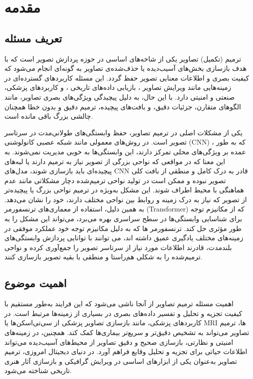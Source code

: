 \chapter{مقدمه}
\section{تعریف مسئله}

ترمیم (تکمیل) تصاویر 
یکی از شاخه‌های اساسی در حوزه پردازش تصویر است که با هدف بازسازی بخش‌های آسیب‌دیده یا حذف‌شده‌ی تصاویر به گونه‌ای انجام می‌شود که کیفیت بصری و اطلاعات معنایی تصویر حفظ گردد. این مسئله کاربردهای گسترده‌ای در زمینه‌هایی مانند ویرایش تصاویر 
\cite{joSCFEGANFaceEditing2019}
، بازیابی داده‌های تاریخی %
\cite{wanBringingOldPhotos2020, wanOldPhotoRestoration2020}%
، و کاربردهای پزشکی، صنعتی و امنیتی دارد. با این حال، به دلیل پیچیدگی ویژگی‌های بصری تصاویر، مانند الگوهای متقارن، جزئیات دقیق، و بافت‌های پیچیده، ترمیم دقیق و بدون خطا همچنان چالشی بزرگ باقی مانده است.

یکی از مشکلات اصلی در ترمیم تصاویر، حفظ وابستگی‌های طولانی‌مدت در سرتاسر تصویر است. در روش‌های معمولی مانند شبکه عصبی کانولوشنی (CNN)
\cite{laubeImageInpaintingHighResolution2018}%
، که به طور عمده بر ویژگی‌های محلی تمرکز دارند، این وابستگی‌ها به خوبی مدیریت نمی‌شوند. به این معنا که در مواقعی که نواحی بزرگی از تصویر نیاز به ترمیم دارند یا لبه‌های پیچیده‌ای باید بازسازی شوند، مدل‌های CNN قادر به درک کامل و منطقی از بافت کلی تصویر نبوده و ممکن است در تولید نواحی ترمیم‌شده دچار مشکلاتی مانند عدم هماهنگی با محیط اطراف شوند. این مشکل به‌ویژه در ترمیم نواحی بزرگ یا پیچیده‌تر از تصویر که نیاز به درک زمینه و روابط بین نواحی مختلف دارند، خود را نشان می‌دهد. به همین دلیل، استفاده از معماری‌های ترنسفورمر (Transformer)
\cite{vaswaniAttentionAllYou2023}
که از مکانیزم توجه
\cite{bahdanauNeuralMachineTranslation2016}
 برای شناسایی وابستگی‌ها در سطح سراسری بهره می‌برد، می‌تواند این مشکل را به طور مؤثری حل کند. ترنسفورمر ها  که به دلیل مکانیزم توجه خود عملکرد موفقی در زمینه‌های مختلف یادگیری عمیق داشته اند، می توانند با توانایی پردازش وابستگی‌های بلندمدت، قادرند اطلاعات مورد نیاز از سرتاسر تصویر را جمع‌آوری کرده و نواحی ترمیم‌شده را به شکلی هم‌راستا و منطقی با بقیه تصویر بازسازی کنند.

\section{اهمیت موضوع}
اهمیت مسئله ترمیم تصاویر از آنجا ناشی می‌شود که این فرایند به‌طور مستقیم با کیفیت تجزیه و تحلیل و تفسیر داده‌های بصری در بسیاری از زمینه‌ها مرتبط است. در کاربردهای پزشکی، مانند بازسازی تصاویر پزشکی از سی‌تی‌اسکن‌ها یا MRI‌ ها، ترمیم تصاویر می‌تواند به تشخیص دقیق‌تر و سریع‌تر بیماری‌ها کمک کند. همچنین، در زمینه‌های امنیتی و نظارتی، بازسازی صحیح و دقیق تصاویر از محیط‌های آسیب‌دیده می‌تواند اطلاعات حیاتی برای تجزیه و تحلیل وقایع فراهم آورد. در دنیای دیجیتال امروزی، ترمیم تصاویر به‌عنوان یکی از ابزارهای اساسی در ویرایش گرافیکی و بازسازی آثار هنری تاریخی شناخته می‌شود.


